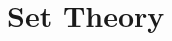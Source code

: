 \documentclass[12pt]{article}
\begin{document}


\section{Set Theory} %
\label{sec:sets}




\end{document}
